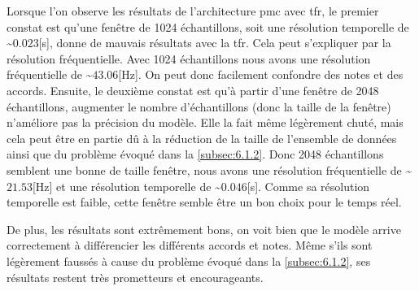 Lorsque l'on observe les résultats de l'architecture \gls{pmc} avec \gls{tfr}, le premier constat est qu'une fenêtre de 1024 échantillons, soit une résolution temporelle de \textasciitilde$0.023$[s], donne de mauvais résultats avec la \gls{tfr}. Cela peut s'expliquer par la résolution fréquentielle. Avec 1024 échantillons nous avons une résolution fréquentielle de \textasciitilde$43.06$[Hz]. On peut donc facilement confondre des notes et des accords. Ensuite, le deuxième constat est qu'à partir d'une fenêtre de 2048 échantillons, augmenter le nombre d'échantillons (donc la taille de la fenêtre) n'améliore pas la précision du modèle. Elle la fait même légèrement chuté, mais cela peut être en partie dû à la réduction de la taille de l'ensemble de données ainsi que du problème évoqué dans la \autoref{subsec:6.1.2}. Donc 2048 échantillons semblent une bonne de taille fenêtre, nous avons une résolution fréquentielle de \textasciitilde$21.53$[Hz] et une résolution temporelle de \textasciitilde$0.046$[s]. Comme sa résolution temporelle est faible, cette fenêtre semble être un bon choix pour le temps réel.

De plus, les résultats sont extrêmement bons, on voit bien que le modèle arrive correctement à différencier les différents accords et notes. Même s'ils sont légèrement faussés à cause du problème évoqué dans la \autoref{subsec:6.1.2}, ses résultats restent très prometteurs et encourageants.

\begin{table}[H]
\end{table}

